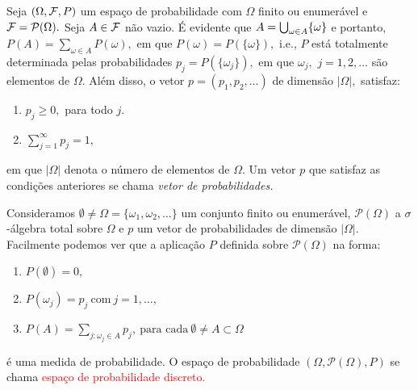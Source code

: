 \begin{frame}

\begin{defi} Seja  $(\Omega, {\cal F}, P)$ um espaço de probabilidade com $\Omega$ finito ou
enumerável e  ${\cal F}=\mathcal{P}(\Omega ).$ Seja $A \in {\cal F}$ não vazio. É
evidente que $A=\bigcup_{\omega\in A}\{{\omega}\}$ e portanto, $P(A) = \sum_{\omega\in
A}{P(\omega)},$ em que $P(\omega)=P(\{\omega\}),$ i.e., $P$ está totalmente
determinada pelas probabilidades  $p_j=P(\{\omega_j\}),$ em que $\omega_j,$ $j=1,2,\ldots$ são
elementos de $\Omega.$ Além disso, o vetor $p=(p_1, p_2, \ldots)$ de dimensão 
$|\Omega|,$  satisfaz: 

\begin{enumerate}
\item $p_j\geq 0,$ para todo $j.$
\item  $\sum_{j=1}^\infty p_j=1,$ 
\end{enumerate}
em que $|\Omega|$ denota o número de elementos de $\Omega.$ Um vetor $p$ que satisfaz
as condições anteriores se chama \emph{ vetor de probabilidades.}
\end{defi}


\begin{defi} Consideramos $\emptyset\neq\Omega=\{\omega_1,\omega_2,\ldots\}$ um conjunto finito ou
enumerável, $ \mathcal{P}(\Omega )$  a $\sigma$-álgebra total sobre $\Omega$ e
$p$ um vetor de probabilidades de dimensão $|\Omega|.$ Facilmente podemos ver
que a aplicação $P$ definida sobre  $\mathcal{P}(\Omega )$ na forma:
\begin{enumerate}
\item $P(\emptyset)=0,$ 
\item $P(\omega_j) =p_j \ \text{com} \  j=1, \ldots ,$
\item $P(A)  =\sum_{j:\omega_j \in A}p_j, \ \text{para cada} \  \emptyset\neq A \subset \Omega$
\end{enumerate}
é uma medida de probabilidade. O espaço de probabilidade $(\Omega, \mathcal{P}(\Omega ), P)$ se
chama \textcolor{red}{espaço de probabilidade discreto.}
\end{defi}
\end{frame}


